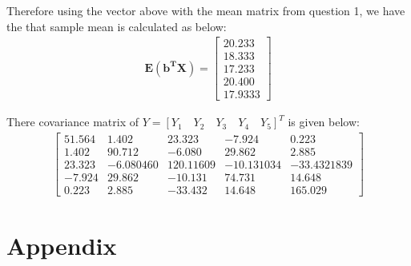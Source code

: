 \documentclass[
]{article}
\begin{document}
Therefore using the vector above with the mean matrix from question 1,
we have the that sample mean is calculated as below: \begin{align}
\mathbf{E(b^{T}X)} = \begin{bmatrix} 20.233\\18.333\\17.233\\20.400\\17.9333 \end{bmatrix}
\end{align}

There covariance matrix of
\(Y = [Y_{1}\quad Y_{2}\quad Y_{3}\quad Y_{4}\quad Y_{5}]^{T}\) is given
below: \begin{align}
\begin{bmatrix} 
  51.564 & 1.402 & 23.323 & -7.924  & 0.223 \\
  1.402 & 90.712 & -6.080 & 29.862 & 2.885 \\
  23.323 & -6.080460 & 120.11609 & -10.131034 & -33.4321839 \\
  -7.924 & 29.862 & -10.131 & 74.731  & 14.648 \\
   0.223 & 2.885 & -33.432  & 14.648 & 165.029
\end{bmatrix}
\end{align}

\newpage
\section{Appendix}
\end{document}

